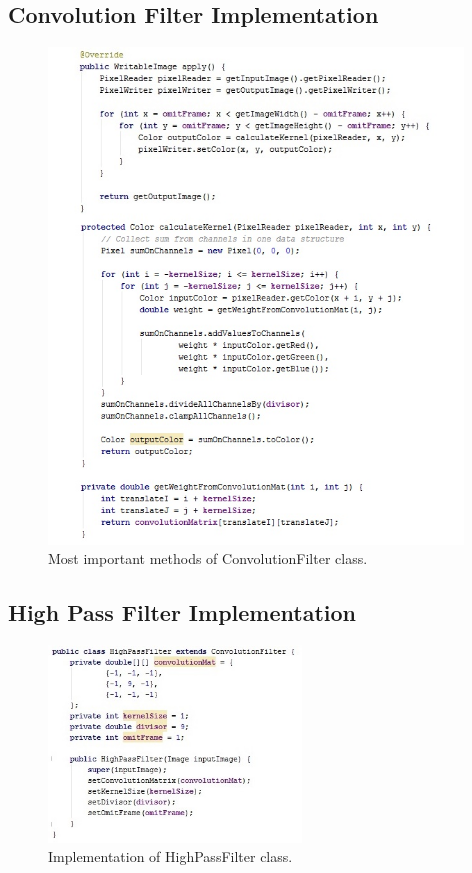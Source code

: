\documentclass{article}
\begin{document}
\subsection{Convolution Filter Implementation} \label{conv_filter_impl}
\begin{figure}[H]
	\centering
	\includegraphics[width=0.98\textwidth]{_Figures/code/conv_filter.jpg}
    \caption{Most important methods of ConvolutionFilter class.}
    \label{fig:code:conv_filter}
\end{figure}


\newpage
%
%
\subsection{High Pass Filter Implementation} \label{high_pass_impl}
\begin{figure}[H]
	\centering
	\includegraphics[width=0.6\textwidth]{_Figures/code/highpass.jpg}
    \caption{Implementation of HighPassFilter class.}
    \label{fig:code:highpass}
\end{figure}
\end{document}
